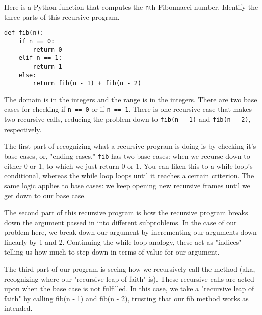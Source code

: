 \begin{blocksection}
\question Here is a Python function that computes the \lstinline$n$th Fibonnacci number. Identify the three parts of this recursive program.

\begin{lstlisting}
def fib(n):
    if n == 0:
        return 0
    elif n == 1:
        return 1
    else:
        return fib(n - 1) + fib(n - 2)
\end{lstlisting}

\begin{solution}[0.5in]
The domain is in the integers and the range is in the integers. There are two
base cases for checking if \lstinline$n == 0$ or if \lstinline$n == 1$. There
is one recursive case that makes two recursive calls, reducing the problem down
to \lstinline$fib(n - 1)$ and \lstinline$fib(n - 2)$, respectively.

The first part of recognizing what a recursive program is doing is by checking it's base cases, or, "ending cases." 
\lstinline$fib$ has two base cases: when we recurse down to either 0 or 1, to which we just return 0 or 1. You can liken this to a while loop's conditional, whereas the while loop loops until it reaches a certain criterion. The same logic applies to base cases: we keep opening new recursive frames until we get down to our base case.

The second part of this recursive program is how the recursive program breaks down the argument passed in into different subproblems. 
In the case of our problem here, we break down our argument by incrementing our arguments down linearly by 1 and 2. Continuing the while loop analogy, these act as "indices" telling us how much to step down in terms of value for our argument.

The third part of our program is seeing how we recursively call the method (aka, recognizing where our "recursive leap of faith" is). These recursive calls are acted upon when the base case is not fulfilled.
In this case, we take a "recursive leap of faith" by calling fib(n - 1) and fib(n - 2), trusting that our fib method works as intended.
\end{solution}
\end{blocksection}
